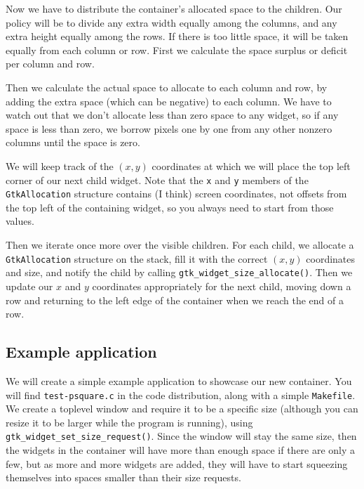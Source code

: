\documentclass[%
			   halfparskip,smallheadings,pointlessnumbers]%
			   {scrartcl} %
\begin{document}
Now we have to distribute the container's allocated space to the children. Our policy will be to divide any extra width equally among the columns, and any extra height equally among the rows. If there is too little space, it will be taken equally from each column or row. First we calculate the space surplus or deficit per column and row.



Then we calculate the actual space to allocate to each column and row, by adding the extra space (which can be negative) to each column. We have to watch out that we don't allocate less than zero space to any widget, so if any space is less than zero, we borrow pixels one by one from any other nonzero columns until the space is zero.



We will keep track of the $(x,y)$ coordinates at which we will place the top left corner of our next child widget. Note that the \lstinline$x$ and \lstinline$y$ members of the \lstinline$GtkAllocation$ structure contains (I think) screen coordinates, not offsets from the top left of the containing widget, so you always need to start from those values.



Then we iterate once more over the visible children. For each child, we allocate a \lstinline$GtkAllocation$ structure on the stack, fill it with the correct $(x,y)$ coordinates and size, and notify the child by calling \lstinline$gtk_widget_size_allocate()$. Then we update our $x$ and $y$ coordinates appropriately for the next child, moving down a row and returning to the left edge of the container when we reach the end of a row.



\subsection{Example application}

We will create a simple example application to showcase our new container. You will find \texttt{test-psquare.c} in the code distribution, along with a simple \texttt{Makefile}. We create a toplevel window and require it to be a specific size (although you can resize it to be larger while the program is running), using \lstinline$gtk_widget_set_size_request()$. Since the window will stay the same size, then the widgets in the container will have more than enough space if there are only a few, but as more and more widgets are added, they will have to start squeezing themselves into spaces smaller than their size requests. 
\end{document}
